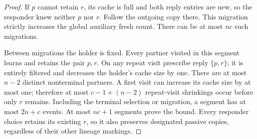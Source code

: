 \documentclass[11pt]{article}
\begin{document}
\begin{proof}
If $p$ cannot retain $r$, its cache is full and both reply
entries are new, so the responder knew neither $p$ nor $r$.
Follow the outgoing copy there. This migration strictly
increases the global auxiliary fresh count.
There can be at most $nc$ such migrations.

Between migrations the holder is fixed. Every partner visited
in this segment learns and retains the pair $p,r$.
On any repeat visit prescribe reply $\{p,r\}$; it is entirely
filtered and decreases the holder's cache size by one.
There are at most $n-2$ distinct nonterminal partners.
A first visit can increase its cache size by at most one;
therefore at most $c-1+(n-2)$ repeat-visit shrinkings occur
before only $r$ remains. Including the terminal selection
or migration, a segment has at most $2n+c$ events.
At most $nc+1$ segments prove the bound.
Every responder choice retains its existing $r$, so it also
preserves designated passive copies, regardless of their
other lineage markings.
\end{proof}
\end{document}
